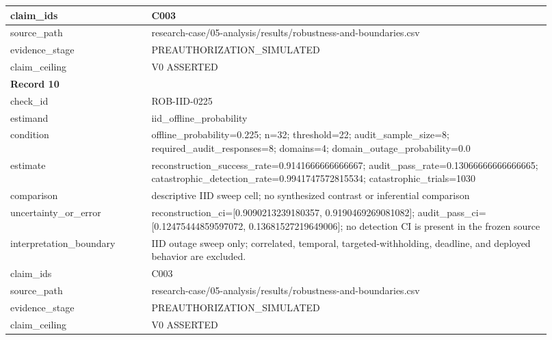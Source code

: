 \begin{longtable}{|p{0.24\linewidth}|p{0.68\linewidth}|}
claim\_\allowbreak{}ids & C003 \\ \hline
source\_\allowbreak{}path & research-case/05-analysis/results/robustness-and-boundaries.csv \\ \hline
evidence\_\allowbreak{}stage & PREAUTHORIZATION\_\allowbreak{}SIMULATED \\ \hline
claim\_\allowbreak{}ceiling & V0 ASSERTED \\ \hline
\multicolumn{2}{|l|}{\textbf{Record 10}} \\ \hline
check\_\allowbreak{}id & ROB-IID-0225 \\ \hline
estimand & iid\_\allowbreak{}offline\_\allowbreak{}probability \\ \hline
condition & offline\_\allowbreak{}probability=0.225;\allowbreak{} n=32;\allowbreak{} threshold=22;\allowbreak{} audit\_\allowbreak{}sample\_\allowbreak{}size=8;\allowbreak{} required\_\allowbreak{}audit\_\allowbreak{}responses=8;\allowbreak{} domains=4;\allowbreak{} domain\_\allowbreak{}outage\_\allowbreak{}probability=0.0 \\ \hline
estimate & reconstruction\_\allowbreak{}success\_\allowbreak{}rate=0.9141666666666667;\allowbreak{} audit\_\allowbreak{}pass\_\allowbreak{}rate=0.13066666666666665;\allowbreak{} catastrophic\_\allowbreak{}detection\_\allowbreak{}rate=0.9941747572815534;\allowbreak{} catastrophic\_\allowbreak{}trials=1030 \\ \hline
comparison & descriptive IID sweep cell;\allowbreak{} no synthesized contrast or inferential comparison \\ \hline
uncertainty\_\allowbreak{}or\_\allowbreak{}error & reconstruction\_\allowbreak{}ci=[0.9090213239180357, 0.9190469269081082];\allowbreak{} audit\_\allowbreak{}pass\_\allowbreak{}ci=[0.12475444859597072, 0.13681527219649006];\allowbreak{} no detection CI is present in the frozen source \\ \hline
interpretation\_\allowbreak{}boundary & IID outage sweep only;\allowbreak{} correlated, temporal, targeted-withholding, deadline, and deployed behavior are excluded. \\ \hline
claim\_\allowbreak{}ids & C003 \\ \hline
source\_\allowbreak{}path & research-case/05-analysis/results/robustness-and-boundaries.csv \\ \hline
evidence\_\allowbreak{}stage & PREAUTHORIZATION\_\allowbreak{}SIMULATED \\ \hline
claim\_\allowbreak{}ceiling & V0 ASSERTED \\ \hline

\end{longtable}
